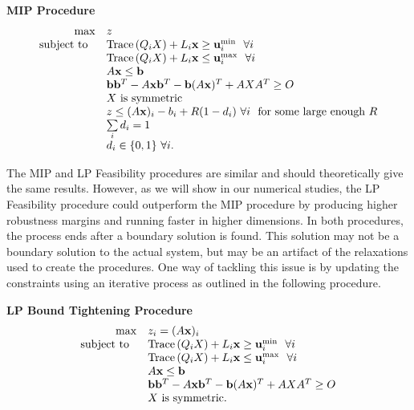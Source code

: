 \bigskip
\textbf{MIP Procedure}\
\begin{equation}\label{eq:OPTfeasrelaxLP2}
\begin{array}{rl}
\max &  z  \\
 \text{subject to } \ &\operatorname{Trace}\left(Q_iX\right)+ L_i\mathbf{x} \geq \mathbf{u}_i^{\min}  \ \ \forall i\\
 & \operatorname{Trace}\left(Q_iX\right)+ L_i\mathbf{x} \leq \mathbf{u}_i^{\max}  \ \ \forall i\\
 	&A\mathbf{x}\leq \mathbf{b} \\
 	&\mathbf{b}\mathbf{b}^T-A\mathbf{x}\mathbf{b}^T-\mathbf{b}(A\mathbf{x})^T+AXA^T\geq O \\
 	&X \text{ is symmetric} \\
 	& z\leq (A\mathbf{x})_i-b_i+R(1-d_i) \ \forall i \ \text{ for some large enough $R$} \\
 	& \sum\limits_i d_i=1 \\
 	& d_i\in\{0,1\} \ \forall i .
\end{array}
\end{equation}


The MIP and LP Feasibility procedures are similar and should theoretically give the same results. 
However, as we will show in our numerical studies, the LP Feasibility procedure could outperform the MIP procedure by producing higher robustness margins and running faster in higher dimensions. 
In both procedures, the process ends after a boundary solution is found. 
This solution may not be a boundary solution to the actual system, but may be an artifact of the relaxations used to create the procedures. 
One way of tackling this issue is by updating the constraints using an iterative process as outlined in the following procedure.

\bigskip
\textbf{LP Bound Tightening Procedure}
\begin{equation}\label{eq:OPTfeasrelaxLP3}
\begin{array}{rl}
\max &  z_i = (A\mathbf{x})_i  \\
 \text{subject to } \ &\operatorname{Trace}\left(Q_iX\right)+ L_i\mathbf{x} \geq \mathbf{u}_i^{\min}  \ \ \forall i\\
 & \operatorname{Trace}\left(Q_iX\right)+ L_i\mathbf{x} \leq \mathbf{u}_i^{\max}  \ \ \forall i\\
 	&A\mathbf{x}\leq \mathbf{b} \\
 	&\mathbf{b}\mathbf{b}^T-A\mathbf{x}\mathbf{b}^T-\mathbf{b}(A\mathbf{x})^T+AXA^T\geq O \\
 	&X \text{ is symmetric.}
\end{array}
\end{equation}

